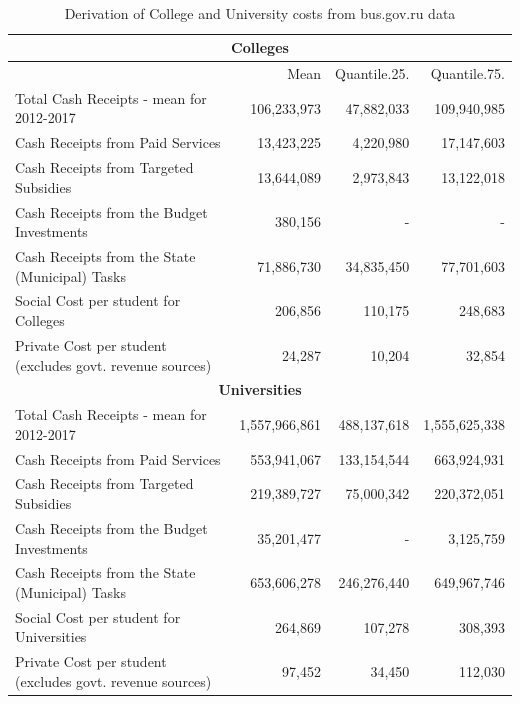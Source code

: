 \documentclass[alpha-refs]{wiley-article-05g}
\begin{document}
\begin{table}[htbp!]
    \centering
		\caption{Derivation of College and University costs from bus.gov.ru data}
		\label{tab:1.2}\\
    \begin{tabular}{|p{6cm}|r|r|r|}
    \hline
       \multicolumn{4}{|c|}{\textbf{Colleges}} \\ \hline
       & Mean & Quantile.25. & Quantile.75. \\ \hline
        Total Cash Receipts - mean for 2012-2017 & 106,233,973 & 47,882,033 & 109,940,985 \\ \hline
        Cash Receipts from Paid Services  & 13,423,225 & 4,220,980 & 17,147,603 \\ \hline
        Cash Receipts from Targeted Subsidies  & 13,644,089 & 2,973,843 & 13,122,018 \\ \hline
        Cash Receipts from the Budget Investments  & 380,156 & -  & - \\ \hline
        Cash Receipts from the State (Municipal) Tasks  & 71,886,730 & 34,835,450 & 77,701,603 \\ \hline
        Social Cost per student for Colleges & 206,856 & 110,175 & 248,683 \\ \hline
        Private Cost per student (excludes govt. revenue sources)  & 24,287 & 10,204 & 32,854 \\ \hline
       \multicolumn{4}{|c|}{\textbf{Universities}} \\ \hline
           Total Cash Receipts - mean for 2012-2017 & 1,557,966,861 & 488,137,618 & 1,555,625,338 \\ \hline
        Cash Receipts from Paid Services & 553,941,067 & 133,154,544 & 663,924,931 \\ \hline
        Cash Receipts from Targeted Subsidies  & 219,389,727 & 75,000,342 & 220,372,051 \\ \hline
        Cash Receipts from the Budget Investments  & 35,201,477 & - & 3,125,759 \\ \hline
        Cash Receipts from the State (Municipal) Tasks  & 653,606,278 & 246,276,440 & 649,967,746 \\ \hline
        Social Cost per student for Universities & 264,869 & 107,278 & 308,393 \\ \hline
        Private Cost per student (excludes govt. revenue sources) & 97,452 & 34,450 & 112,030 \\ \hline
    \end{tabular}
\end{table}
\end{document}
